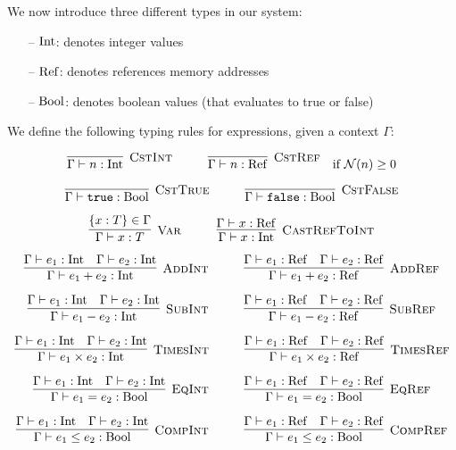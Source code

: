 We now introduce three different types in our system:

\begin{itemize}
	\itemsep0em
	\item[--] $\mathrm{Int}{}$: denotes integer values
	\item[--] $\mathrm{Ref}{}$: denotes references \ie{} memory addresses
	\item[--] $\mathrm{Bool}{}$: denotes boolean values (that evaluates to true or false)
\end{itemize}

We define the following typing rules for expressions, given a context $\Gamma$:

\[
\Rule{CstInt}{\Gamma \vdash n: \Int}{}
\hspace*{1cm}
\Rule{CstRef}{\Gamma \vdash n: \Ref}{} \quad \text{if $\N(n) \geq 0$}
\]

\[
\Rule{CstTrue}{\Gamma \vdash \texttt{true}: \Bool}{}
\hspace*{1cm}
\Rule{CstFalse}{\Gamma \vdash \texttt{false}: \Bool}{}
\]

\[
\Rule{Var}{\Gamma \vdash x: T}{\lbrace x: T \rbrace \in \Gamma}
\hspace*{1cm}
\Rule{CastRefToInt}{\Gamma \vdash x: \Int}{\Gamma \vdash x: \Ref}
\]

\[
\Rule{AddInt}{\Gamma \vdash e_1 + e_2: \Int}{\Gamma \vdash e_1: \Int \quad \Gamma \vdash e_2: \Int}
\hspace*{1cm}
\Rule{AddRef}{\Gamma \vdash e_1 + e_2: \Ref}{\Gamma \vdash e_1: \Ref \quad \Gamma \vdash e_2: \Ref}
\]

\[
\Rule{SubInt}{\Gamma \vdash e_1 - e_2: \Int}{\Gamma \vdash e_1: \Int \quad \Gamma \vdash e_2: \Int}
\hspace*{1cm}
\Rule{SubRef}{\Gamma \vdash e_1 - e_2: \Ref}{\Gamma \vdash e_1: \Ref \quad \Gamma \vdash e_2: \Ref}
\]

\[
\Rule{TimesInt}{\Gamma \vdash e_1 \times e_2: \Int}{\Gamma \vdash e_1: \Int \quad \Gamma \vdash e_2: \Int}
\hspace*{1cm}
\Rule{TimesRef}{\Gamma \vdash e_1 \times e_2: \Ref}{\Gamma \vdash e_1: \Ref \quad \Gamma \vdash e_2: \Ref}
\]

\[
\Rule{EqInt}{\Gamma \vdash e_1 = e_2: \Bool}{\Gamma \vdash e_1: \Int \quad \Gamma \vdash e_2: \Int}
\hspace*{1cm}
\Rule{EqRef}{\Gamma \vdash e_1 = e_2: \Bool}{\Gamma \vdash e_1: \Ref \quad \Gamma \vdash e_2: \Ref}
\]

\[
\Rule{CompInt}{\Gamma \vdash e_1 \leq e_2: \Bool}{\Gamma \vdash e_1: \Int \quad \Gamma \vdash e_2: \Int}
\hspace*{1cm}
\Rule{CompRef}{\Gamma \vdash e_1 \leq e_2: \Bool}{\Gamma \vdash e_1: \Ref \quad \Gamma \vdash e_2: \Ref}
\]

